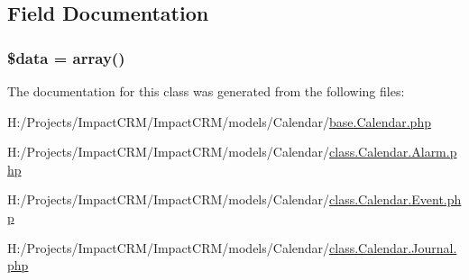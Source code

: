 \subsection{Field Documentation}
\hypertarget{classCalendar__Base_a6efc15b5a2314dd4b5aaa556a375c6d6}{
\subsubsection[{\$data}]{\setlength{\rightskip}{0pt plus 5cm}\$data = array()}}
\label{classCalendar__Base_a6efc15b5a2314dd4b5aaa556a375c6d6}


The documentation for this class was generated from the following files:\begin{DoxyCompactItemize}
\item 
H:/Projects/ImpactCRM/ImpactCRM/models/Calendar/\hyperlink{base_8Calendar_8php}{base.Calendar.php}\item 
H:/Projects/ImpactCRM/ImpactCRM/models/Calendar/\hyperlink{class_8Calendar_8Alarm_8php}{class.Calendar.Alarm.php}\item 
H:/Projects/ImpactCRM/ImpactCRM/models/Calendar/\hyperlink{class_8Calendar_8Event_8php}{class.Calendar.Event.php}\item 
H:/Projects/ImpactCRM/ImpactCRM/models/Calendar/\hyperlink{class_8Calendar_8Journal_8php}{class.Calendar.Journal.php}\end{DoxyCompactItemize}
